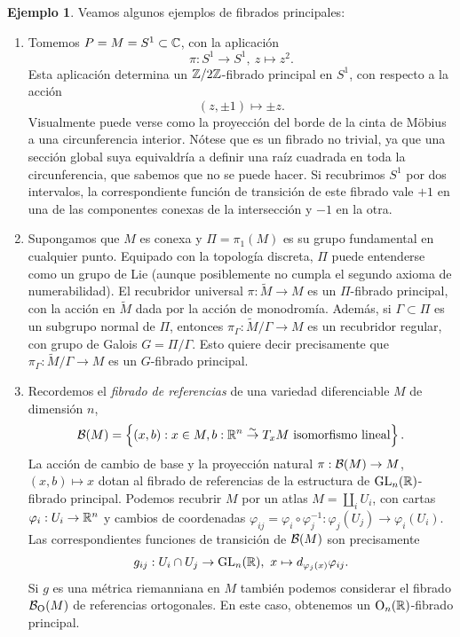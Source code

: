 \documentclass[11pt,a4paper]{amsbook}
\theoremstyle{remark} \newtheorem{rmk}[subsection]{Observación}
\theoremstyle{definition} \newtheorem{defn}[subsection]{Definición}
\theoremstyle{definition} \newtheorem{ex}[subsection]{Ejemplo}
\theoremstyle{definition} \newtheorem{ej}[subsection]{Ejercicio}
\begin{document}
\begin{ex}
  Veamos algunos ejemplos de fibrados principales:
  \begin{enumerate}
    \item Tomemos $P=M=S^1\subset \mathbb C$, con la aplicación
          \begin{equation*}
\pi: S^1\rightarrow S^1,\ z \mapsto z^2.
          \end{equation*}
          Esta aplicación determina un $\mathbb Z/2\mathbb Z$-fibrado principal en $S^1$, con respecto a la acción
          \begin{equation*}
(z,\pm 1) \mapsto \pm z.
          \end{equation*}
Visualmente puede verse como la proyección del borde de la cinta de Möbius a una circunferencia interior. Nótese que es un fibrado no trivial, ya que una sección global suya equivaldría a definir una raíz cuadrada en toda la circunferencia, que sabemos que no se puede hacer. Si recubrimos $S^1$ por dos intervalos, la correspondiente función de transición de este fibrado vale $+1$ en una de las componentes conexas de la intersección y $-1$ en la otra.

    \item Supongamos que $M$ es conexa y $\Pi=\pi_1(M)$ es su grupo fundamental en cualquier punto. Equipado con la topología discreta, $\Pi$ puede entenderse como un grupo de Lie (aunque posiblemente no cumpla el segundo axioma de numerabilidad). El recubridor universal $\pi:\widetilde{M}\rightarrow M$ es un $\Pi$-fibrado principal, con la acción en $\widetilde{M}$ dada por la acción de monodromía. Además, si $\Gamma \subset \Pi$ es un subgrupo normal de $\Pi$, entonces $\pi_\Gamma:\widetilde{M}/\Gamma \rightarrow M$ es un recubridor regular, con grupo de Galois $G=\Pi/\Gamma$. Esto quiere decir precisamente que $\pi_\Gamma:\widetilde{M}/\Gamma \rightarrow M$ es un $G$-fibrado principal.

\item Recordemos el \emph{fibrado de referencias} de una variedad diferenciable $M$ de dimensión $n$,
\begin{equation*}
\mathcal B(M) = \left\{ (x,b): x\in M, b:\mathbb R^n \overset{\sim}{\rightarrow} T_x M \text{ isomorfismo lineal} \right\}.
\end{equation*}
La acción de cambio de base y la proyección natural $\pi:\mathcal B(M)\rightarrow M$, $(x,b)\mapsto x$ dotan al fibrado de referencias de la estructura de $\operatorname{GL}_n(\mathbb R)$-fibrado principal. Podemos recubrir $M$ por un atlas $M=\coprod_{i} U_i$, con cartas $\varphi_i:U_i\rightarrow \mathbb R^n$ y cambios de coordenadas $\varphi_{ij}=\varphi_i\circ \varphi_j^{-1}:\varphi_j(U_j) \rightarrow \varphi_i(U_i)$. Las correspondientes funciones de transición de $\mathcal B(M)$ son precisamente
          \begin{equation*}
g_{ij}: U_i \cap U_j \rightarrow \operatorname{GL}_n(\mathbb R), \ x \mapsto d_{\varphi_j(x)}\varphi_{ij}.
          \end{equation*}
  Si $g$ es una métrica riemanniana en $M$ también podemos considerar el fibrado $\mathcal B_{\operatorname{O}}(M)$ de referencias ortogonales. En este caso, obtenemos un $\operatorname{O}_n(\mathbb R)$-fibrado principal.
  \end{enumerate}
\end{ex}
\end{document}
